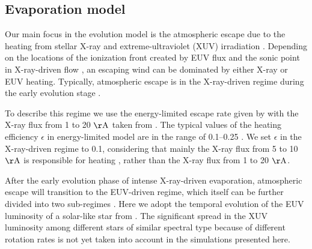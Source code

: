 \documentclass[]{emulateapj}
\begin{document}
\subsection{{Evaporation model}}
Our main focus in the evolution model is the atmospheric escape due to the heating from stellar X-ray and extreme-ultraviolet (XUV) irradiation \citep[e.g.,][]{Watson1981,Lammer2003,Baraffe2004,Yelle2004,Tian2005,Murray-Clay2009,Owen2012,Owen2016}. Depending on the locations of the ionization front created by EUV flux and the sonic point in X-ray-driven flow \citep{Owen2012}, an escaping wind can be dominated by either X-ray or EUV heating. Typically, atmospheric escape is in the X-ray-driven regime during the early evolution stage \citep{Owen2012,Jin2014}. 

To describe this regime we use the energy-limited escape rate given by \citet{Jackson2012} with the X-ray flux from 1 to 20 ${\rm \AA}$ taken from \citet{Ribas2005}. The typical values of the heating efficiency $\epsilon$ in energy-limited model are in the range of 0.1--0.25 \citep{Lammer2009,Jackson2012}. We set $\epsilon$ in the X-ray-driven regime to 0.1, considering that mainly the X-ray flux from 5 to 10 ${\rm \AA}$ is responsible for heating \citep{Owen2012}, rather than the X-ray flux from 1 to 20 ${\rm \AA}$.

After the early evolution phase of intense X-ray-driven evaporation, atmospheric escape will transition to the EUV-driven regime, which itself can be further divided into two sub-regimes \citep{Murray-Clay2009}. Here we adopt the temporal evolution of the EUV luminosity of a solar-like star from \citet{Ribas2005}. The significant spread in the XUV luminosity among different stars of similar spectral type because of different rotation rates \citep{Tu2015} is  not yet taken into account in the simulations presented here.
\end{document}
